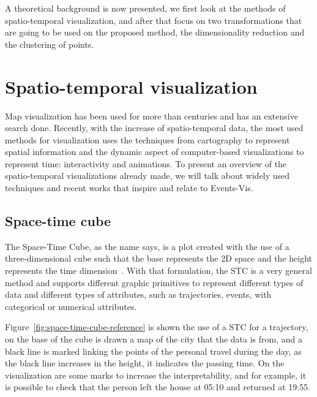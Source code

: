 \label{ch:background}

A theoretical background is now presented, we first look at the methods of spatio-temporal visualization, and after that focus on two transformations that are going to be used on the proposed method, the dimensionality reduction and the clustering of points.

\section{Spatio-temporal visualization}

Map visualization has been used for more than centuries and has an extensive search done.
%
Recently, with the increase of spatio-temporal data, the most used methods for visualization uses the techniques from cartography to represent spatial information and the dynamic aspect of computer-based visualizations to represent time: interactivity and animations. 
%
To present an overview of the spatio-temporal visualizations already made, we will talk about widely used techniques and recent works that inspire and relate to Events-Vis.

\subsection{Space-time cube}

The Space-Time Cube, as the name says, is a plot created with the use of a three-dimensional cube such that the base represents the 2D space and the height represents the time dimension~\cite{bach2017descriptive}.
%
With that formulation, the STC is a very general method and supports different graphic primitives to represent different types of data and different types of attributes, such as trajectories, events, with categorical or numerical attributes.
%

Figure~\ref{fig:space-time-cube-reference} is shown the use of a STC for a trajectory, on the base of the cube is drawn a map of the city that the data is from, and a black line is marked linking the points of the personal travel during the day, as the black line increases in the height, it indicates the passing time. On the visualization are some marks to increase the interpretability, and for example, it is possible to check that the person left the house at 05:10 and returned at 19:55.

